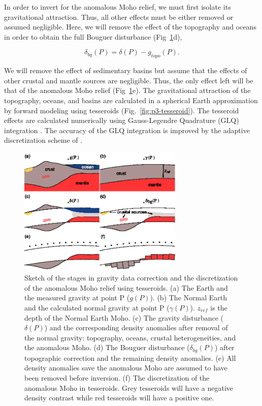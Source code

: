 In order to invert for the anomalous Moho relief,
we must first isolate its gravitational attraction.
Thus, all other effects
must be either removed or assumed negligible.
Here, we will remove the effect of the topography and oceans
in order to obtain the full Bouguer disturbance
(Fig~\ref{fig:p3-anomalysketch}d),

\begin{equation}
    \delta_{bg}(P) = \delta(P) - g_{topo}(P).
    \label{eq:p3-bouguer}
\end{equation}

\noindent
We will remove the effect of sedimentary basins
but assume that the effects of
other crustal and mantle sources are negligible.
Thus, the only effect left will be that of the anomalous Moho relief
(Fig~\ref{fig:p3-anomalysketch}e).
The gravitational attraction of the topography, oceans, and basins are
calculated in a spherical Earth approximation by forward modeling using
tesseroids (Fig.~\ref{fig:p3-tesseroid}).
The tesseroid effects are calculated numerically using
Gauss-Legendre Quadrature (GLQ) integration \citep{asgharzadeh2007}.
The accuracy of the GLQ integration is improved by the adaptive discretization
scheme of \citet{uieda2016}.


\begin{figure}
    \centering
    \includegraphics[width=0.7\textwidth]{figures/paper-moho/problem-concept}
    \caption{
        Sketch of the stages in gravity data correction and
        the discretization of the anomalous Moho relief using tesseroids.
        (a) The Earth and the measured gravity at point P ($g(P)$).
        (b) The Normal Earth and the calculated normal gravity at point P
        ($\gamma(P)$). $z_{ref}$ is the depth of the Normal Earth Moho.
        (c) The gravity disturbance ($\delta(P)$) and
        the corresponding density anomalies after removal of the normal gravity:
        topography, oceans, crustal heterogeneities, and the anomalous Moho.
        (d) The Bouguer disturbance ($\delta_{bg}(P)$) after topographic
        correction and the remaining density anomalies.
        (e) All density anomalies save the anomalous Moho are assumed to have
        been removed before inversion.
        (f) The discretization of the anomalous Moho in tesseroids. Grey
        tesseroids will have a negative density contrast while red tesseroids
        will have a positive one.
    }
    \label{fig:p3-anomalysketch}
\end{figure}

